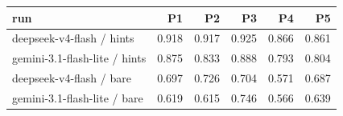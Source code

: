 \begin{tabular}{lrrrrr}
\toprule
run & P1 & P2 & P3 & P4 & P5 \\
\midrule
deepseek-v4-flash / hints & 0.918 & 0.917 & 0.925 & 0.866 & 0.861 \\
gemini-3.1-flash-lite / hints & 0.875 & 0.833 & 0.888 & 0.793 & 0.804 \\
deepseek-v4-flash / bare & 0.697 & 0.726 & 0.704 & 0.571 & 0.687 \\
gemini-3.1-flash-lite / bare & 0.619 & 0.615 & 0.746 & 0.566 & 0.639 \\
\bottomrule
\end{tabular}
